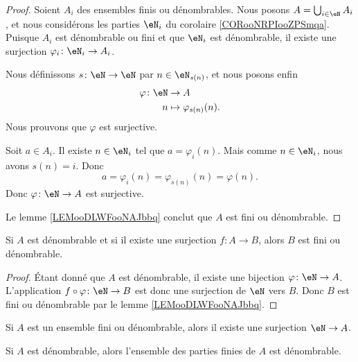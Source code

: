 \begin{proof}
	Soient \( A_i\) des ensembles finis ou dénombrables. Nous posons \( A=\bigcup_{i\in \eN}A_i\), et nous considérons les parties \( \eN_i\) du corolaire \ref{CORooNRPIooZPSmqa}. Puisque \( A_i\) est dénombrable ou fini et que \( \eN_i\) est dénombrable, il existe une surjection \( \varphi_i\colon \eN_i\to A_i\).

	Nous définissons \( s\colon \eN\to \eN\) par \( n\in \eN_{s(n)}\), et nous posons enfin
	\begin{equation}
		\begin{aligned}
			\varphi\colon \eN & \to A                      \\
			n                 & \mapsto \varphi_{s(n)}(n).
		\end{aligned}
	\end{equation}
	Nous prouvons que \( \varphi\) est surjective.

	Soit \( a\in A_i\). Il existe \( n\in \eN_i\) tel que \( a=\varphi_i(n)\). Mais comme \( n\in \eN_i\), nous avons \( s(n)=i\). Donc
	\begin{equation}
		a=\varphi_i(n)=\varphi_{s(n)}(n)=\varphi(n).
	\end{equation}
	Donc \( \varphi\colon \eN\to A\) est surjective.

	Le lemme \ref{LEMooDLWFooNAJbbq} conclut que \( A\) est fini ou dénombrable.
\end{proof}



\begin{lemma}       \label{LEMooDTAEooIBdHyo}
	Si \( A\) est dénombrable et si il existe une surjection \( f\colon A\to B\), alors \( B\) est fini ou dénombrable.
\end{lemma}

\begin{proof}
	Étant donné que \( A\) est dénombrable, il existe une bijection \(\varphi \colon \eN\to A  \). L'application \(f\circ \varphi \colon \eN\to B  \) est donc une surjection de \( \eN\) vers \( B\). Donc \( B\) est fini ou dénombrable par le lemme \ref{LEMooDLWFooNAJbbq}.
\end{proof}


\begin{lemma}       \label{LEMooSRZWooASgEfy}
	Si \( A\) est un ensemble fini ou dénombrable, alors il existe une surjection \( \eN\to A\).
\end{lemma}


\begin{lemma}		\label{LEMooKFBAooHxgOsg}
	Si \( A\) est dénombrable, alors l'ensemble des parties finies de \( A\) est dénombrable.
\end{lemma}

